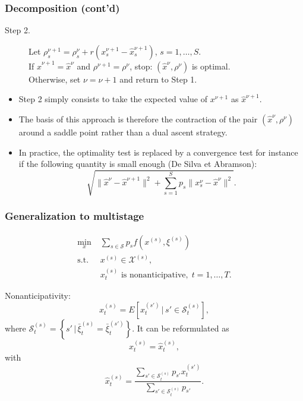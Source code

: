 \documentclass[french]{beamer}
\def\cS{\mathcal{S}}
\def\cX{\mathcal{X}}
\begin{document}
\begin{frame}
\frametitle{Decomposition (cont'd)}

\begin{description}
\item[Step 2.]
Let $\rho^{\nu+1}_s = \rho^{\nu}_s + r\left(x_s^{\nu+1}-\hat{x}_s
^{\nu+1}\right)$, $s = 1,\ldots{}, S$.\\
If $\hat{x}^{\nu+1} = \hat{x}^{\nu}$ and $\rho^{\nu+1} = \rho^{\nu}$,
stop: $(\hat{x}^{\nu}, \rho^{\nu})$ is optimal.\\
Otherwise, set $\nu = \nu+1$ and return to Step 1.
\end{description}

\mbox{}

\begin{itemize}
\item
Step 2 simply consists to take the expected value of $x^{\nu+1}$
as $\hat{x}^{\nu+1}$.
\item
The basis of this approach is therefore the contraction of the pair $(\hat{x}^{\nu}, \rho^{\nu})$ around a saddle point rather than a dual ascent strategy.
\item
In practice, the optimality test is replaced by a convergence test for instance if the following quantity is small enough (De Silva et Abramson):
\[
\sqrt{ \| \hat{x}^{\nu} - \hat{x}^{\nu+1} \|^2 + \sum_{s = 1}^S p_s \|
  x_s^{\nu} - \hat{x}^{\nu}\|^2}.
\]
\end{itemize}

\end{frame}

\begin{frame}
\frametitle{Generalization to multistage}

$$
\begin{aligned}
\min_{x}\; & \sum_{s \in \cS} p_s f\left(x^{(s)}, \xi^{(s)}\right)\\
\text{s.t. } & x^{(s)} \in \cX^{(s)},\\
& x_t^{(s)} \mbox{ is nonanticipative},\; t = 1, \dots, T.
\end{aligned}
$$

Nonanticipativity:
$$
x_t^{(s)} = E\left[ x_t^{(s')} \,\big|\, s' \in \cS_t^{(s)} \right],
$$
where $\cS_t^{(s)} = \left\{ s' \,\big|\, \bar{\xi}_t^{(s)} = \bar{\xi}_t^{(s') }\right\}$.
It can be reformulated as
\[
x_t^{(s)} = \hat{x}_t^{(s)},
\]
with
$$
\hat{x}_t^{(s)} = \frac{\sum_{s' \in \cS_{t}^{(s)}} p_{s'} x_t^{(s')}}{\sum_{s' \in \cS_t^{(s)}} p_{s'}}.
$$

\end{frame}
\end{document}
